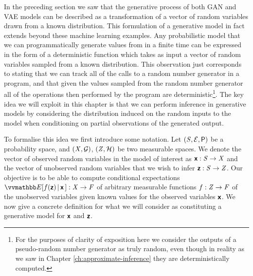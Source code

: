 In the preceding section we saw that the generative process of both \ac{GAN} and \ac{VAE} models can be described as a transformation of a vector of random variables drawn from a known distribution. This formulation of a generative model in fact extends beyond these machine learning examples. Any probabilistic model that we can programmatically generate values from in a finite time can be expressed in the form of a deterministic function which takes as input a vector of random variables sampled from a known distribution. This observation just corresponds to stating that we can track all of the calls to a random number generator in a program, and that given the values sampled from the random number generator all of the operations then performed by the program are deterministic\footnote{For the purposes of clarity of exposition here we consider the outputs of a pseudo-random number generator as truly random, even though in reality as we saw in Chapter \ref{ch:approximate-inference} they are deterministically computed.}. The key idea we will exploit in this chapter is that we can perform inference in generative models by considering the distribution induced on the random inputs to the model when conditioning on partial observations of the generated output. 

To formalise this idea we first introduce some notation. Let $(\mathit{S}, \mathcal{E}, \mathsf{P})$ be a probability space, and $(\mathit{X}, \mathcal{G})$, $(\mathit{Z}, \mathcal{H})$ be two measurable spaces. We denote the vector of observed random variables in the model of interest as $\boldsymbol{\mathsf{x}} : \mathit{S} \to \mathit{X}$ and the vector of unobserved random variables that we wish to infer $\boldsymbol{\mathsf{z}} : \mathit{S} \to \mathit{Z}$. Our objective is to be able to compute conditional expectations $\expc{f(\rvct{z}) \gvn \rvct{x}\,} : \set{X} \to \set{F}$ of arbitrary measurable functions $f : \mathit{Z} \to \mathit{F}$ of the unobserved variables given known values for the observed variables $\boldsymbol{\mathsf{x}}$. %
We now give a concrete definition for what we will consider as constituting a generative model for $\boldsymbol{\mathsf{x}}$ and $\boldsymbol{\mathsf{z}}$.

